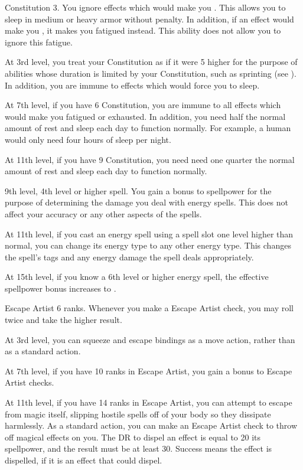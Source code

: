     \featpre Constitution 3.
    \featben You ignore effects which would make you \fatigued.
    This allows you to sleep in medium or heavy armor without penalty.
    In addition, if an effect would make you \exhausted, it makes you fatigued instead.
    This ability does not allow you to ignore this fatigue.

    At 3rd level, you treat your Constitution as if it were 5 higher for the purpose of abilities whose duration is limited by your Constitution, such as sprinting (see ).
    In addition, you are immune to effects which would force you to sleep.

    At 7th level, if you have 6 Constitution, you are immune to all effects which would make you fatigued or exhausted.
    In addition, you need half the normal amount of rest and sleep each day to function normally.
    For example, a human would only need four hours of sleep per night.

    At 11th level, if you have 9 Constitution, you need need one quarter the normal amount of rest and sleep each day to function normally.

    \featpre 9th level, 4th level or higher  spell.
    \featben You gain a  bonus to spellpower for the purpose of determining the damage you deal with energy spells.
    This does not affect your accuracy or any other aspects of the spells.

    At 11th level, if you cast an energy spell using a spell slot one level higher than normal, you can change its energy type to any other energy type.
    This changes the spell's tags and any energy damage the spell deals appropriately.

    At 15th level, if you know a 6th level or higher energy spell, the effective spellpower bonus increases to .

    \featpre Escape Artist 6 ranks.
    \featben Whenever you make a Escape Artist check, you may roll twice and take the higher result.

    At 3rd level, you can squeeze and escape bindings as a move action, rather than as a standard action.

    At 7th level, if you have 10 ranks in Escape Artist, you gain a  bonus to Escape Artist checks.

    At 11th level, if you have 14 ranks in Escape Artist, you can attempt to escape from magic itself, slipping hostile spells off of your body so they dissipate harmlessly.
    As a standard action, you can make an Escape Artist check to throw off magical effects on you.
    The DR to dispel an effect is equal to 20 \add its spellpower, and the result must be at least 30.
    Success means the effect is dispelled, if it is an effect that  could dispel.
    \magical

